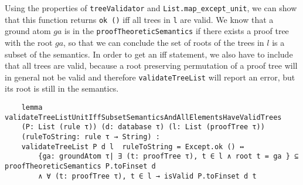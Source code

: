 Using the properties of \texttt{treeValidator} and \texttt{List.map\_except\_unit}, we can show that this function returns \texttt{ok ()} iff all trees in \texttt{l} are valid. We know that a ground atom $ga$ is in the \texttt{proofTheoreticSemantics} if there exists a proof tree with the root $ga$, so that we can conclude the set of roots of the trees in $l$ is a subset of the semantics. In order to get an iff statement, we also have to include that all trees are valid, because a root preserving permutation of a proof tree will in general not be valid and therefore \texttt{validateTreeList} will report an error, but its root is still in the semantics.

\begin{lstlisting}
    lemma validateTreeListUnitIffSubsetSemanticsAndAllElementsHaveValidTrees 
    (P: List (rule τ)) (d: database τ) (l: List (proofTree τ)) 
    (ruleToString: rule τ → String) : 
    validateTreeList P d l  ruleToString = Except.ok () ↔ 
        {ga: groundAtom τ| ∃ (t: proofTree τ), t ∈ l ∧ root t = ga } ⊆ proofTheoreticSemantics P.toFinset d 
        ∧ ∀ (t: proofTree τ), t ∈ l → isValid P.toFinset d t
\end{lstlisting}

